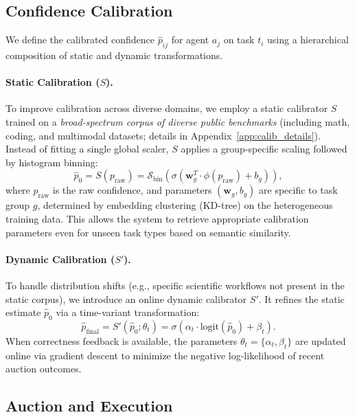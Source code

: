 \documentclass[11pt]{article}
\begin{document}
\subsection{Confidence Calibration}
We define the calibrated confidence $\hat{p}_{ij}$ for agent $a_j$ on task $t_i$ using a hierarchical composition of static and dynamic transformations.

\paragraph{Static Calibration ($S$).} 
To improve calibration across diverse domains, we employ a static calibrator $S$ trained on a \emph{broad-spectrum corpus of diverse public benchmarks} (including math, coding, and multimodal datasets; details in Appendix~\ref{app:calib_details}).
Instead of fitting a single global scaler, $S$ applies a group-specific scaling followed by histogram binning:
\begin{equation}
\hat{p}_0 = S(p_{\text{raw}}) = \mathcal{S}_{\text{bin}}\left( \sigma( \mathbf{w}_g^T \cdot \phi(p_{\text{raw}}) + b_g ) \right),
\end{equation}
where $p_{\text{raw}}$ is the raw confidence, and parameters $(\mathbf{w}_g, b_g)$ are specific to task group $g$, determined by embedding clustering (KD-tree) on the heterogeneous training data.
This allows the system to retrieve appropriate calibration parameters even for unseen task types based on semantic similarity.

\paragraph{Dynamic Calibration ($S'$).}
To handle distribution shifts (e.g., specific scientific workflows not present in the static corpus), we introduce an online dynamic calibrator $S'$.
It refines the static estimate $\hat{p}_0$ via a time-variant transformation:
\begin{equation}
\hat{p}_{\text{final}} = S'(\hat{p}_0; \theta_t) = \sigma\left( \alpha_t \cdot \text{logit}(\hat{p}_0) + \beta_t \right).
\end{equation}
When correctness feedback is available, the parameters $\theta_t = \{\alpha_t, \beta_t\}$ are updated online via gradient descent to minimize the negative log-likelihood of recent auction outcomes.

\subsection{Auction and Execution}
\end{document}
